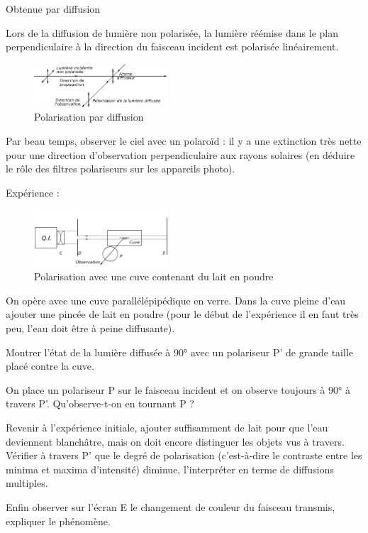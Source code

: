 \documentclass{article}%
\begin{document}
Obtenue par diffusion

Lors de la diffusion de lumière non polarisée, la lumière réémise dans le plan perpendiculaire à la direction du faisceau incident est polarisée linéairement.
\begin{figure}
	\centerline{\includegraphics[width=5cm]{images-exp/Polardiffatom.png}}
	\caption{Polarisation par diffusion}
\end{figure}

Par beau temps, observer le ciel avec un polaroïd : il y a une extinction très nette pour une direction d'observation perpendiculaire aux rayons solaires (en déduire le rôle des filtres polariseurs sur les appareils photo).

Expérience :

\begin{figure}
	\centerline{\includegraphics[width=5cm]{images-exp/Polarcuve.png}}
	\caption{Polarisation avec une cuve contenant du lait en poudre}
\end{figure}

On opère avec une cuve parallélépipédique en verre. Dans la cuve pleine d’eau ajouter une pincée de lait en poudre (pour le début de l'expérience il en faut très peu, l'eau doit être à peine diffusante).

Montrer l’état de la lumière diffusée à 90° avec un polariseur P' de grande taille placé contre la cuve.

On place un polariseur P sur le faisceau incident et on observe toujours à 90° à travers P'. Qu'observe-t-on en tournant P ?

Revenir à l'expérience initiale, ajouter suffisamment de lait pour que l'eau deviennent blanchâtre, mais on doit encore distinguer les objets vus à travers. Vérifier à travers P' que le degré de polarisation (c'est-à-dire le contraste entre les minima et maxima d'intensité) diminue, l'interpréter en terme de diffusions multiples.

Enfin observer sur l'écran E le changement de couleur du faisceau transmis, expliquer le phénomène.
\end{document}
